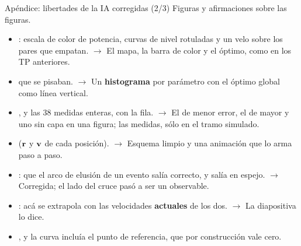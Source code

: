 \documentclass[aspectratio=169,11pt]{beamer}
\begin{document}
\begin{frame}[noframenumbering]{Apéndice: libertades de la IA corregidas (2/3)}
    \vspace{-0.5em}
    {\scriptsize\color{gris} Figuras y afirmaciones sobre las figuras.}
    \vspace{0.3em}
    \footnotesize
    \begin{itemize}\setlength{\itemsep}{0.3em}
        \item {}:
              escala de color de potencia, curvas de nivel rotuladas y un velo
              sobre los pares que empatan. $\to$ El mapa, la barra de color y el
              óptimo, como en los TP anteriores.
        \item {} que se pisaban. $\to$ Un \textbf{histograma} por
              parámetro con el óptimo global como línea vertical.
        \item {}, y
              las 38 medidas enteras, con la fila. $\to$ El de menor error, el
              de mayor y uno sin capa en una figura; las medidas, sólo en el
              tramo simulado.
        \item {} ($\mathbf{r}$ y $\mathbf{v}$
              de cada posición). $\to$ Esquema limpio y una animación que lo arma
              paso a paso.
        \item {}: que el arco de elusión de un evento salía correcto, y
              salía en espejo. $\to$ Corregida; el lado del cruce pasó a ser un
              observable.
        \item {}: acá se extrapola con las velocidades \textbf{actuales}
              de los dos. $\to$ La diapositiva lo dice.
        \item {}, y la curva incluía el punto de referencia, que
              por construcción vale cero.
    \end{itemize}
\end{frame}
\end{document}
